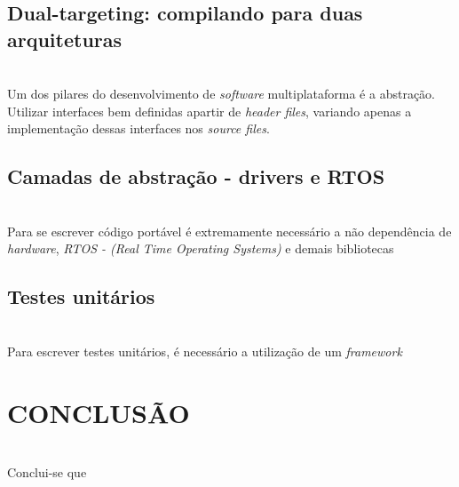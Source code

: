 \documentclass[times, twoside, watermark]{artigo}
\begin{document}
\subsection{Dual-targeting: compilando para duas arquiteturas}\hfill\\

Um dos pilares do desenvolvimento de \textit{software} multiplataforma é a abstração.
Utilizar interfaces bem definidas apartir de \textit{header files}, variando apenas
a implementação dessas interfaces nos \textit{source files}.

\subsection{Camadas de abstração - drivers e RTOS}\hfill\\

Para se escrever código portável é extremamente necessário a não dependência de 
\textit{hardware}, \textit{RTOS - (Real Time Operating Systems)} e demais bibliotecas

\subsection{Testes unitários}\hfill\\

Para escrever testes unitários, é necessário a utilização de um \textit{framework}


\section{CONCLUSÃO}\hfill\\
Conclui-se que 



\end{document}
